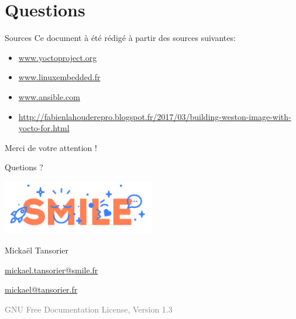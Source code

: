 \documentclass[compress]{smilebeamer}
\begin{document}
\section*{Questions}

\begin{frame}{Sources}
Ce document à été rédigé à partir des sources suivantes:\newline

\begin{itemize}
	\item \url{www.yoctoproject.org}
	\item \url{www.linuxembedded.fr}
	\item \url{www.ansible.com}
	\item \url{http://fabienlahouderepro.blogspot.fr/2017/03/building-weston-image-with-yocto-for.html}
\end{itemize}
\end{frame}

\begin{frame}
\centering
\textcolor{smileOrange}{\huge{Merci de votre attention !}}

\textcolor[RGB]{99,153,253}{Quetions ?}

\includegraphics[width=0.5\textwidth]{logos/smile-logo.png}

Mickaël Tansorier

\url{mickael.tansorier@smile.fr}

\url{mickael@tansorier.fr}

\vfill
\textcolor{gray}{\tiny{GNU Free Documentation License, Version 1.3}}
\end{frame}
\end{document}
